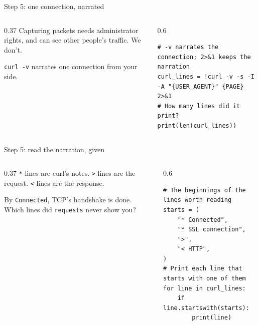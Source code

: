 \documentclass[9pt,aspectratio=169]{beamer}
\begin{document}
\begin{frame}[fragile]{Step 5: one connection, narrated}
    \begin{columns}[T]
        \begin{column}{0.37\textwidth}
            Capturing packets needs administrator rights, and can see other people's traffic. We don't.

            \medskip
            \texttt{curl -v} narrates one connection from your side.
        \end{column}
        \begin{column}{0.6\textwidth}
\begin{lstlisting}[style=lab]
# -v narrates the connection; 2>&1 keeps the narration
curl_lines = !curl -v -s -I -A "{USER_AGENT}" {PAGE} 2>&1
# How many lines did it print?
print(len(curl_lines))
\end{lstlisting}
        \end{column}
    \end{columns}
\end{frame}

\begin{frame}[fragile]{Step 5: read the narration, given}
    \begin{columns}[T]
        \begin{column}{0.37\textwidth}
            \texttt{*} lines are curl's notes. \texttt{>} lines are the request. \texttt{<} lines are the response.

            \medskip
            By \texttt{Connected}, TCP's handshake is done. Which lines did \texttt{requests} never show you?
        \end{column}
        \begin{column}{0.6\textwidth}
\begin{lstlisting}[style=lab]
# The beginnings of the lines worth reading
starts = (
    "* Connected",
    "* SSL connection",
    ">",
    "< HTTP",
)
# Print each line that starts with one of them
for line in curl_lines:
    if line.startswith(starts):
        print(line)
\end{lstlisting}
        \end{column}
    \end{columns}
\end{frame}
\end{document}
